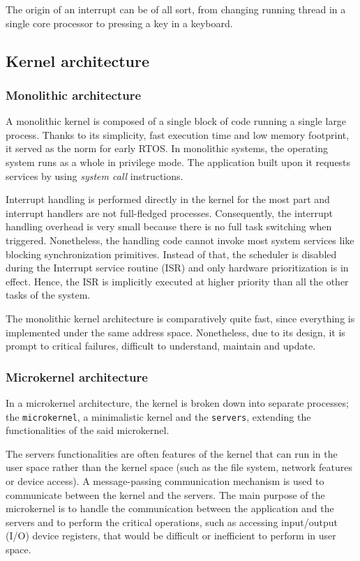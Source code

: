 The origin of an interrupt can be of all sort, 
    from changing running thread in a single core processor to pressing a key in a keyboard.

\subsection{Kernel architecture}

\subsubsection{Monolithic architecture}
A monolithic kernel is composed of a single block of code running a single large process.
Thanks to its simplicity, fast execution time and low memory footprint, it served as the norm for early RTOS.
In monolithic systems, the operating system runs as a whole in privilege mode.
The application built upon it requests services by using \textit{system call} instructions.

Interrupt handling is performed directly in the kernel for the most part and interrupt handlers are not full-fledged processes.
Consequently, the interrupt handling overhead is very small because there is no full task switching when triggered.
Nonetheless, the handling code cannot invoke most system services like blocking synchronization primitives.
Instead of that, the scheduler is disabled during the Interrupt service routine (ISR) and only hardware prioritization is in effect.
Hence, the ISR is implicitly executed at higher priority than all the other tasks of the system.

The monolithic kernel architecture is comparatively quite fast, since ev\-ery\-thing is implemented under the same address space.
Nonetheless, due to its design, it is prompt to critical failures, difficult to understand, maintain and update.

\subsubsection{Microkernel architecture}
In a microkernel architecture, the kernel is broken down into separate processes;
     the \texttt{microkernel}, a minimalistic kernel
     and the \texttt{servers}, extending the functionalities of the said microkernel.

The servers functionalities are often features of the kernel that can run in the user space
    rather than the kernel space (such as the file system, network features or device access).
A message-passing communication mechanism is used to communicate between the kernel and the servers.
The main purpose of the microkernel is to handle the communication between the application and the servers
    and to perform the critical operations, such as accessing input/output (I/O) device registers, that would be difficult or inefficient to perform in user space.

